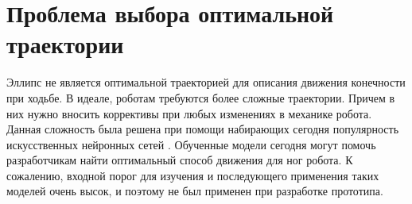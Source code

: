 \section{Проблема выбора оптимальной траектории}

Эллипс не является оптимальной траекторией для описания движения конечности при ходьбе. В идеале, роботам требуются более сложные траектории. Причем в них нужно вносить коррективы при любых изменениях в механике робота. Данная сложность была решена при помощи набирающих сегодня популярность искусственных нейронных сетей \cite{Singla2018}. Обученные модели сегодня могут помочь разработчикам найти оптимальный способ движения для ног робота. К сожалению, входной порог для изучения и последующего применения таких моделей очень высок, и поэтому не был применен при разработке прототипа.